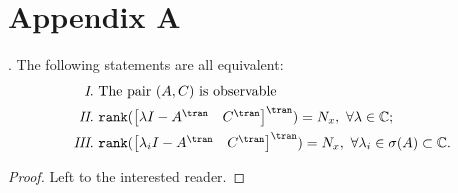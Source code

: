 \chapter*{Appendix A} \label{sec: Appendix}

\lipsum[1-2]

\begin{boxedlemma}{\cite{Hautus1970}.} \label{def: Lemma_1}
	The following statements are all equivalent: 
	\begin{subequations} \begin{align}
		\text{\emph{ I}. }& \text{The pair $(A, C)$ is observable} \\
		\text{\emph{ II}. }&\texttt{rank}(\begin{bmatrix} \lambda I - A^{\tran}  & C^{\tran} \end{bmatrix}^{\tran} ) = N_x,  \text{ } \forall \lambda \in \mathbb{C}; \\
		\text{\emph{ III}. }&\texttt{rank}(\begin{bmatrix} \lambda_i I - A^{\tran}  &  C^{\tran} \end{bmatrix}^{\tran}) = N_x, \text{ } \forall \lambda_i \in \sigma(A) \subset \mathbb{C}.
	\end{align}	\end{subequations}
\end{boxedlemma}

\begin{proof}
	Left to the interested reader.
\end{proof}

\lipsum[1][1-6]